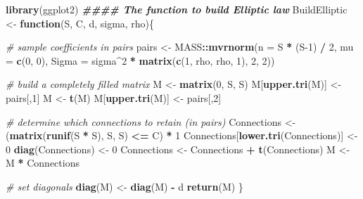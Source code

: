 \documentclass[
]{book}
\newenvironment{Shaded}{\begin{snugshade}}{\end{snugshade}}
\newcommand{\AttributeTok}[1]{\textcolor[rgb]{0.13,0.29,0.53}{#1}}
\newcommand{\CommentTok}[1]{\textcolor[rgb]{0.56,0.35,0.01}{\textit{#1}}}
\newcommand{\ControlFlowTok}[1]{\textcolor[rgb]{0.13,0.29,0.53}{\textbf{#1}}}
\newcommand{\DecValTok}[1]{\textcolor[rgb]{0.00,0.00,0.81}{#1}}
\newcommand{\DocumentationTok}[1]{\textcolor[rgb]{0.56,0.35,0.01}{\textbf{\textit{#1}}}}
\newcommand{\FunctionTok}[1]{\textcolor[rgb]{0.13,0.29,0.53}{\textbf{#1}}}
\newcommand{\NormalTok}[1]{#1}
\newcommand{\OtherTok}[1]{\textcolor[rgb]{0.56,0.35,0.01}{#1}}
\newcommand{\SpecialCharTok}[1]{\textcolor[rgb]{0.81,0.36,0.00}{\textbf{#1}}}
\begin{document}
\begin{Shaded}
\begin{Highlighting}[]
\FunctionTok{library}\NormalTok{(ggplot2)}
\DocumentationTok{\#\#\#\# The function to build Elliptic law}
\NormalTok{BuildElliptic }\OtherTok{\textless{}{-}} \ControlFlowTok{function}\NormalTok{(S, C, d, sigma, rho)\{}
  
  \CommentTok{\# sample coefficients in pairs}
\NormalTok{  pairs }\OtherTok{\textless{}{-}}\NormalTok{ MASS}\SpecialCharTok{::}\FunctionTok{mvrnorm}\NormalTok{(}\AttributeTok{n =}\NormalTok{ S }\SpecialCharTok{*}\NormalTok{ (S}\DecValTok{{-}1}\NormalTok{) }\SpecialCharTok{/} \DecValTok{2}\NormalTok{,}
                         \AttributeTok{mu =} \FunctionTok{c}\NormalTok{(}\DecValTok{0}\NormalTok{, }\DecValTok{0}\NormalTok{),}
                         \AttributeTok{Sigma =}\NormalTok{ sigma}\SpecialCharTok{\^{}}\DecValTok{2} \SpecialCharTok{*} \FunctionTok{matrix}\NormalTok{(}\FunctionTok{c}\NormalTok{(}\DecValTok{1}\NormalTok{, rho, rho, }\DecValTok{1}\NormalTok{), }\DecValTok{2}\NormalTok{, }\DecValTok{2}\NormalTok{))}
  
  \CommentTok{\# build a completely filled matrix}
\NormalTok{  M }\OtherTok{\textless{}{-}} \FunctionTok{matrix}\NormalTok{(}\DecValTok{0}\NormalTok{, S, S)}
\NormalTok{  M[}\FunctionTok{upper.tri}\NormalTok{(M)] }\OtherTok{\textless{}{-}}\NormalTok{ pairs[,}\DecValTok{1}\NormalTok{]}
\NormalTok{  M }\OtherTok{\textless{}{-}} \FunctionTok{t}\NormalTok{(M)}
\NormalTok{  M[}\FunctionTok{upper.tri}\NormalTok{(M)] }\OtherTok{\textless{}{-}}\NormalTok{ pairs[,}\DecValTok{2}\NormalTok{]}
  
  \CommentTok{\# determine which connections to retain (in pairs)}
\NormalTok{  Connections }\OtherTok{\textless{}{-}}\NormalTok{ (}\FunctionTok{matrix}\NormalTok{(}\FunctionTok{runif}\NormalTok{(S }\SpecialCharTok{*}\NormalTok{ S), S, S) }\SpecialCharTok{\textless{}=}\NormalTok{ C) }\SpecialCharTok{*} \DecValTok{1} 
\NormalTok{  Connections[}\FunctionTok{lower.tri}\NormalTok{(Connections)] }\OtherTok{\textless{}{-}} \DecValTok{0}
  \FunctionTok{diag}\NormalTok{(Connections) }\OtherTok{\textless{}{-}} \DecValTok{0}
\NormalTok{  Connections }\OtherTok{\textless{}{-}}\NormalTok{ Connections }\SpecialCharTok{+} \FunctionTok{t}\NormalTok{(Connections)}
\NormalTok{  M }\OtherTok{\textless{}{-}}\NormalTok{ M }\SpecialCharTok{*}\NormalTok{ Connections}
  
  \CommentTok{\# set diagonals}
  \FunctionTok{diag}\NormalTok{(M) }\OtherTok{\textless{}{-}} \FunctionTok{diag}\NormalTok{(M) }\SpecialCharTok{{-}}\NormalTok{ d}
  \FunctionTok{return}\NormalTok{(M)}
\NormalTok{\}}
\end{Highlighting}
\end{Shaded}
\end{document}
